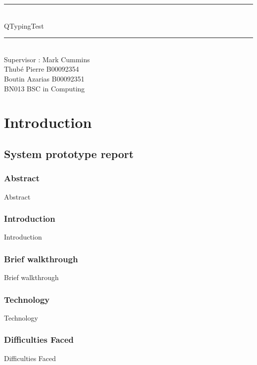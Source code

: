 \documentclass[12pt]{report}
\newcommand{\Mline}{\hrule \mbox{}\\[0.1cm]}
\begin{document}
\begin{titlepage}
\begin{center}


\Mline
{ \LARGE QTypingTest \\[0.4cm] }
\Mline

\textsf{Supervisor : Mark Cummins}\\[3cm]

\textsf{Thubé Pierre B00092354\\
	Boutin Azarias B00092351\\[2cm]
	BN013 BSC in Computing}

\end{center}
\end{titlepage}

\setcounter{page}{2}

\tableofcontents

\part{Introduction}

\chapter{System prototype report}

\section{Abstract}
Abstract

\section{Introduction}
Introduction

\section{Brief walkthrough}
Brief walkthrough

\section{Technology}
Technology

\section{Difficulties Faced}
Difficulties Faced
\end{document}
